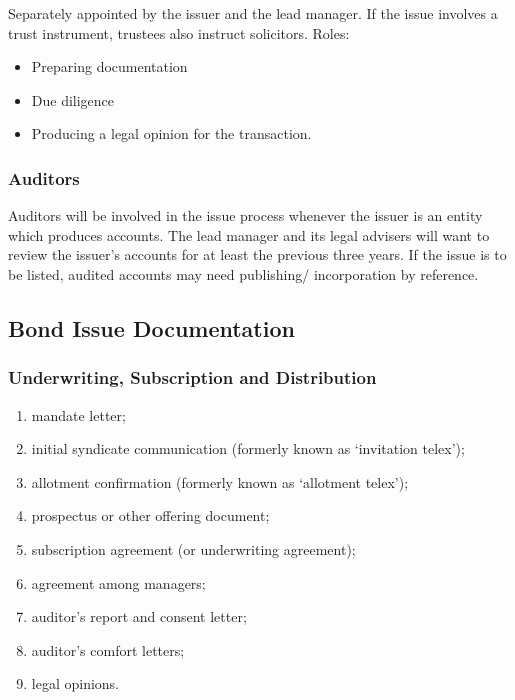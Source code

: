 \documentclass[
]{article}
\providecommand{\tightlist}{%
  \setlength{\itemsep}{0pt}\setlength{\parskip}{0pt}}
\begin{document}
Separately appointed by the issuer and the lead manager. If the issue
involves a trust instrument, trustees also instruct solicitors. Roles:

\begin{itemize}
\tightlist
\item
  Preparing documentation
\item
  Due diligence
\item
  Producing a legal opinion for the transaction.
\end{itemize}

\hypertarget{auditors}{%
\subsubsection{Auditors}\label{auditors}}

Auditors will be involved in the issue process whenever the issuer is an
entity which produces accounts. The lead manager and its legal advisers
will want to review the issuer's accounts for at least the previous
three years. If the issue is to be listed, audited accounts may need
publishing/ incorporation by reference.

\hypertarget{bond-issue-documentation}{%
\subsection{Bond Issue Documentation}\label{bond-issue-documentation}}

\hypertarget{underwriting-subscription-and-distribution}{%
\subsubsection{Underwriting, Subscription and
Distribution}\label{underwriting-subscription-and-distribution}}

\begin{enumerate}
\tightlist
\item
  mandate letter;
\item
  initial syndicate communication (formerly known as `invitation
  telex');
\item
  allotment confirmation (formerly known as `allotment telex');
\item
  prospectus or other offering document;
\item
  subscription agreement (or underwriting agreement);
\item
  agreement among managers;
\item
  auditor's report and consent letter;
\item
  auditor's comfort letters;
\item
  legal opinions.
\end{enumerate}
\end{document}
